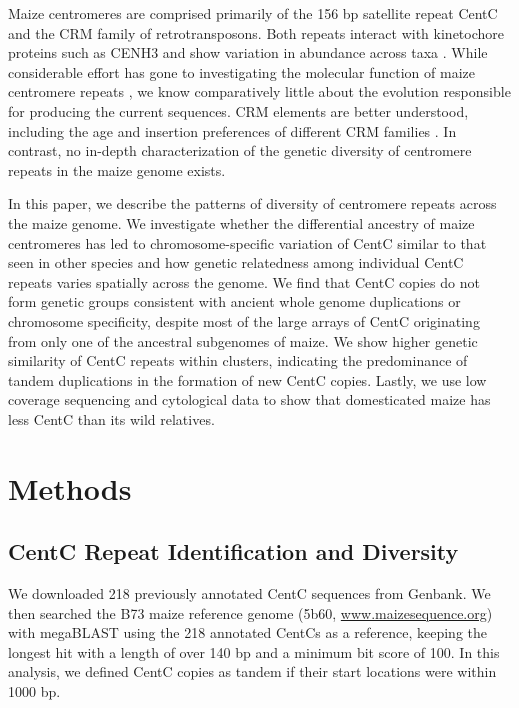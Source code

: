 Maize centromeres are comprised primarily of the 156 bp satellite repeat CentC and the CRM family of retrotransposons.
Both repeats interact with kinetochore proteins such as CENH3 \citep{Wolfgruber2009, Zhong2002} and show variation in abundance across taxa \citep{Albert2010}.
While considerable effort has gone to investigating the molecular function of maize centromere repeats \citep{Ananiev1998B, Nagaki2003, Wolfgruber2009}, we know comparatively little about the evolution responsible for producing the current sequences. 
CRM elements are better understood, including the age and insertion preferences of different CRM families \citep{Wolfgruber2009, Sharma2008, Sharma09052014}.
In contrast, no in-depth characterization of the genetic diversity of centromere repeats in the maize genome exists.  

In this paper, we describe the patterns of diversity of centromere repeats across the maize genome.  
We investigate whether the differential ancestry of maize centromeres \citep{Wang2012} has led to chromosome-specific variation of CentC similar to that seen in other species \citep{Kawabe2005, hall2005differential, macas2010global} and how genetic relatedness among individual CentC repeats varies spatially across the genome.
We find that CentC copies do not form genetic groups consistent with ancient whole genome duplications or chromosome specificity, despite most of the large arrays of CentC originating from only one of the ancestral subgenomes of maize.
We show higher genetic similarity of CentC repeats within clusters, indicating the predominance of tandem duplications in the formation of new CentC copies.
Lastly, we use low coverage sequencing and cytological data to show that domesticated maize has less CentC than its wild relatives.

\section*{Methods} 
\label{methods}

\subsection*{CentC Repeat Identification and Diversity}

We downloaded 218 previously annotated CentC sequences \citep{Ananiev1998B, Nagaki2003} from Genbank.  
We then searched the B73 maize reference genome (5b60, \url{www.maizesequence.org}) with megaBLAST \citep{McGinnis2004} using the 218 annotated CentCs as a reference, keeping the longest hit with a length of over 140 bp and a minimum bit score of 100.
In this analysis, we defined CentC copies as tandem if their start locations were within 1000 bp.
	
